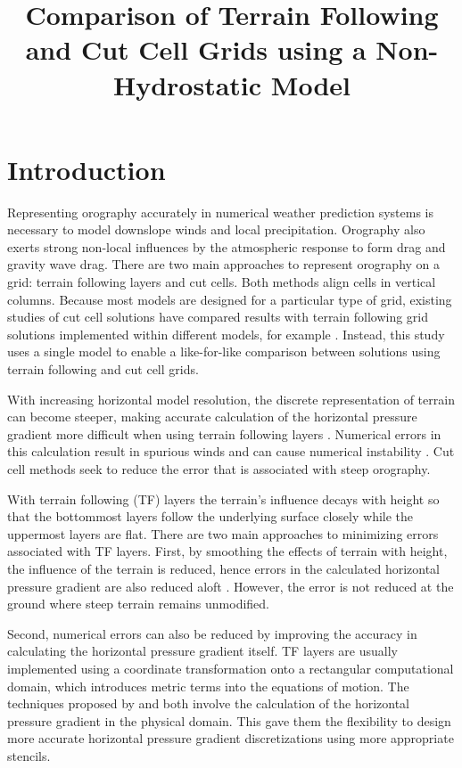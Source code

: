 \documentclass[twocol]{ametsoc}
\title{Comparison of Terrain Following and Cut Cell Grids using a Non-Hydrostatic Model}
\affiliation{Department of Meteorology, University of Reading, Reading, United Kingdom}
\begin{document}
\newcommand{\TODO}[1]{\textcolor{purple}{TODO: \emph{#1}}}

\maketitle

\section{Introduction}
Representing orography accurately in numerical weather prediction systems is necessary to model downslope winds and local precipitation.  Orography also exerts strong non-local influences by the atmospheric response to form drag and gravity wave drag.  There are two main approaches to represent orography on a grid: terrain following layers and cut cells.  Both methods align cells in vertical columns.  Because most models are designed for a particular type of grid, existing studies of cut cell solutions have compared results with terrain following grid solutions implemented within different models, for example \citet{good2014}.  Instead, this study uses a single model to enable a like-for-like comparison between solutions using terrain following and cut cell grids.

With increasing horizontal model resolution, the discrete representation of terrain can become steeper, making accurate calculation of the horizontal pressure gradient more difficult when using terrain following layers \citep{gary1973,steppeler2002}.  Numerical errors in this calculation result in spurious winds and can cause numerical instability \citep{fast2003,webster2003}.  Cut cell methods seek to reduce the error that is associated with steep orography.

With terrain following (TF) layers the terrain's influence decays with height so that the bottommost layers follow the underlying surface closely while the uppermost layers are flat.  There are two main approaches to minimizing errors associated with TF layers.  First, by smoothing the effects of terrain with height, the influence of the terrain is reduced, hence errors in the calculated horizontal pressure gradient are also reduced aloft \citep{schaer2002,leuenberger2010,klemp2011}.  However, the error is not reduced at the ground where steep terrain remains unmodified.

Second, numerical errors can also be reduced by improving the accuracy in calculating the horizontal pressure gradient itself.  TF layers are usually implemented using a coordinate transformation onto a rectangular computational domain, which introduces metric terms into the equations of motion.  The techniques proposed by \citet{klemp2011} and \cite{zaengl2012} both involve the calculation of the horizontal pressure gradient in the physical domain.  This gave them the flexibility to design more accurate horizontal pressure gradient discretizations using more appropriate stencils.
\end{document}
